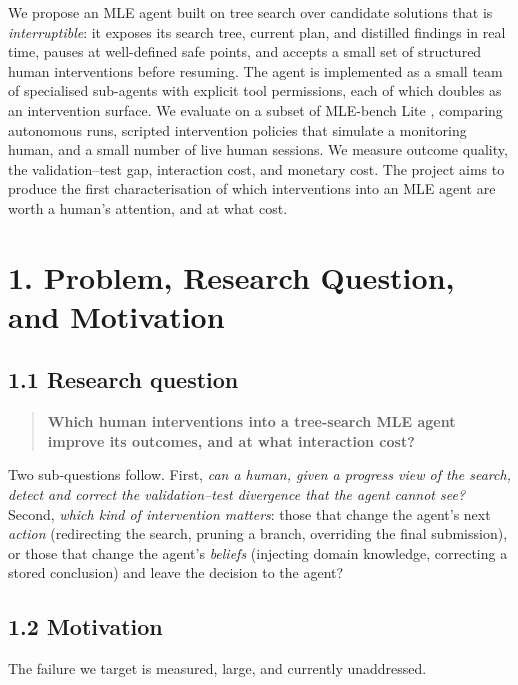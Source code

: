 \documentclass[11pt]{article}
\begin{document}
We propose an MLE agent built on tree search over candidate solutions that is
\emph{interruptible}: it exposes its search tree, current plan, and distilled
findings in real time, pauses at well-defined safe points, and accepts a small set of
structured human interventions before resuming. The agent is implemented as a small
team of specialised sub-agents with explicit tool permissions, each of which doubles
as an intervention surface. We evaluate on a subset of MLE-bench Lite
\cite{mlebench}, comparing autonomous runs, scripted intervention policies that
simulate a monitoring human, and a small number of live human sessions. We measure
outcome quality, the validation--test gap, interaction cost, and monetary cost. The
project aims to produce the first characterisation of which interventions into an MLE
agent are worth a human's attention, and at what cost.

\section*{1. Problem, Research Question, and Motivation}

\subsection*{1.1 Research question}

\begin{quote}
\textbf{Which human interventions into a tree-search MLE agent improve its outcomes,
and at what interaction cost?}
\end{quote}

Two sub-questions follow. First, \emph{can a human, given a progress view of the
search, detect and correct the validation--test divergence that the agent cannot
see?} Second, \emph{which kind of intervention matters}: those that change the
agent's next \emph{action} (redirecting the search, pruning a branch, overriding the
final submission), or those that change the agent's \emph{beliefs} (injecting domain
knowledge, correcting a stored conclusion) and leave the decision to the agent?

\subsection*{1.2 Motivation}

The failure we target is measured, large, and currently unaddressed.
\end{document}
